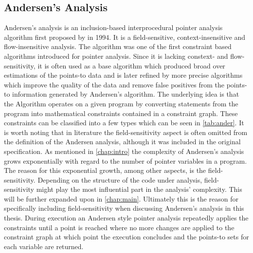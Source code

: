 \subsection{Andersen's Analysis}\label{sec:ander}
Andersen's analysis is an inclusion-based interprocedural pointer analysis algorithm first proposed by \cite{andersen1994program} in 1994. It is a field-sensitive, context-insensitive and flow-insensitive analysis. 
The algorithm was one of the first constraint based algorithms introduced for pointer analysis. Since it is lacking constext- and flow-sensitivity, it is often used as a base algorithm which produced broad over estimations of the points-to data and is later refined by more precise algorithms which improve the quality of the data and remove false positives from the points-to information generated by Andersen's algorithm.
The underlying idea is that the Algorithm operates on a given program by converting statements from the program into mathematical constraints contained in a constraint graph.
These constraints can be classified into a few types which can be seen in \autoref{tab:ander}.
It is worth noting that in literature the field-sensitivity aspect is often omitted from the definition of the Andersen analysis, although it was included in the original specification.
As mentioned in \autoref{chap:intro} the complexity of Andersen's analysis grows exponentially with regard to the number of pointer variables in a program. The reason for this exponential growth, among other aspects, is the field-sensitivity. Depending on the structure of the code under analysis, field-sensitivity might play the most influential part in the analysis' complexity. This will be further expanded upon in \autoref{chap:main}. Ultimately this is the reason for specifically including field-sensitivity when discussing Andersen's analysis in this thesis.
During execution an Andersen style pointer analysis repeatedly applies the constraints until a point is reached where no more changes are applied to the constraint graph at which point the execution concludes and the points-to sets for each variable are returned.
